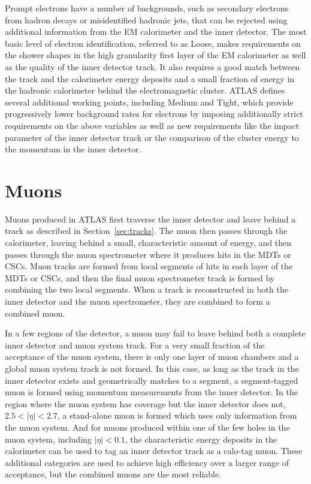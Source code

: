 Prompt electrons have a number of backgrounds, such as secondary electrons from hadron decays or misidentified hadronic jets, that can be rejected using additional information from the \ac{EM} calorimeter and the inner detector.
The most basic level of electron identification, referred to as Loose, makes requirements on the shower shapes in the high granularity first layer of the \ac{EM} calorimeter as well as the quality of the inner detector track.
It also requires a good match between the track and the calorimeter energy deposits and a small fraction of energy in the hadronic calorimeter behind the electromagnetic cluster.
\ac{ATLAS} defines several additional working points, including Medium and Tight, which provide progressively lower background rates for electrons by imposing additionally strict requirements on the above variables as well as new requirements like the impact parameter of the inner detector track or the comparison of the cluster energy to the momentum in the inner detector.


\section{Muons}
\label{sec:muons}

Muons produced in \ac{ATLAS} first traverse the inner detector and leave behind a track as described in Section~\ref{sec:tracks}.
The muon then passes through the calorimeter, leaving behind a small, characteristic amount of energy, and then passes through the muon spectrometer where it produces hits in the \acp{MDT} or \acp{CSC}.
Muon tracks are formed from local segments of hits in each layer of the \acp{MDT} or \acp{CSC}, and then the final muon spectrometer track is formed by combining the two local segments.
When a track is reconstructed in both the inner detector and the muon spectrometer, they are combined to form a combined muon.

In a few regions of the detector, a muon may fail to leave behind both a complete inner detector and muon system track.
For a very small fraction of the acceptance of the muon system, there is only one layer of muon chambers and a global muon system track is not formed.
In this case, as long as the track in the inner detector exists and geometrically matches to a segment, a segment-tagged muon is formed using momentum measurements from the inner detector.
In the region where the muon system has coverage but the inner detector does not, $2.5 < |\eta| < 2.7$, a stand-alone muon is formed which uses only information from the muon system.
And for muons produced within one of the few holes in the muon system, including $|\eta| < 0.1$, the characteristic energy deposits in the calorimeter can be used to tag an inner detector track as a calo-tag muon.
These additional categories are used to achieve high efficiency over a larger range of acceptance, but the combined muons are the most reliable.

